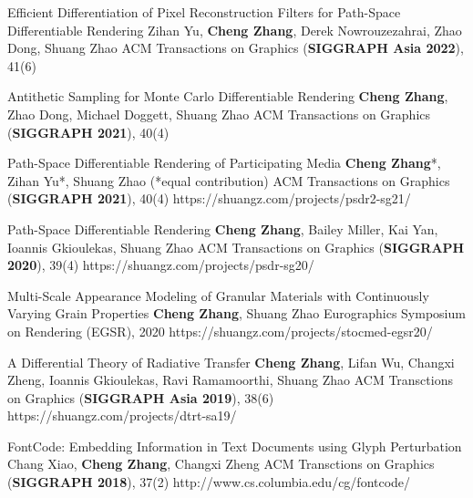 
\begin{cvpublications}{}

    \cvpublication
	{Efficient Differentiation of Pixel Reconstruction Filters for Path-Space Differentiable Rendering}
	{Zihan Yu, \textbf{Cheng Zhang},  Derek Nowrouzezahrai, Zhao Dong, Shuang Zhao}
	{ACM Transactions on Graphics (\textbf{SIGGRAPH Asia 2022}), 41(6)}
	{}

    \cvpublication
	{Antithetic Sampling for Monte Carlo Differentiable Rendering}
	{\textbf{Cheng Zhang}, Zhao Dong, Michael Doggett, Shuang Zhao}
	{ACM Transactions on Graphics (\textbf{SIGGRAPH 2021}), 40(4)}
	{}


    \cvpublication
	{Path-Space Differentiable Rendering of Participating Media}
	{\textbf{Cheng Zhang}*, Zihan Yu*, Shuang Zhao (*equal contribution)}
	{ACM Transactions on Graphics (\textbf{SIGGRAPH 2021}), 40(4)}
	{https://shuangz.com/projects/psdr2-sg21/}


    \cvpublication
	{Path-Space Differentiable Rendering}
	{\textbf{Cheng Zhang}, Bailey Miller, Kai Yan, Ioannis Gkioulekas, Shuang Zhao}
	{ACM Transactions on Graphics (\textbf{SIGGRAPH 2020}), 39(4)}
	{https://shuangz.com/projects/psdr-sg20/}

    \cvpublication
	{Multi-Scale Appearance Modeling of Granular Materials with Continuously Varying Grain Properties}
	{\textbf{Cheng Zhang}, Shuang Zhao}
	{Eurographics Symposium on Rendering (EGSR), 2020}
	{https://shuangz.com/projects/stocmed-egsr20/}

    \cvpublication
	{A Differential Theory of Radiative Transfer}
	{\textbf{Cheng Zhang}, Lifan Wu, Changxi Zheng, Ioannis Gkioulekas, Ravi Ramamoorthi, Shuang Zhao}
	{ACM Transctions on Graphics (\textbf{SIGGRAPH Asia 2019}), 38(6)}
	{https://shuangz.com/projects/dtrt-sa19/}

	\cvpublication
	{FontCode: Embedding Information in Text Documents using Glyph Perturbation}
	{Chang Xiao, \textbf{Cheng Zhang}, Changxi Zheng}
	{ACM Transctions on Graphics (\textbf{SIGGRAPH 2018}), 37(2)}
	{http://www.cs.columbia.edu/cg/fontcode/}

\end{cvpublications}
